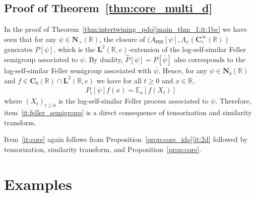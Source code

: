 \documentclass[12pt]{amsart}
\newcommand{\hlabel}{\phantomsection\label}
\numberwithin{equation}{section}
\newcommand{\bb}{\mathbb}
\renewcommand{\ge}{\geqslant}
\newcommand{\ov}{\overline}
\newcommand{\ttt}{\mathtt}
\newcommand{\bmrm}[2][2]{\mathbf{#2}^{#1}}
\newcommand{\C}{\mathbf{C}}
\newcommand{\LRe}{\bmrm{L}(\bb{R},e)}
\newcommand{\NN}{\mathbf{N}}
\theoremstyle{definition}
\theoremstyle{assump}
\theoremstyle{remark}
\begin{document}
{\subsection{Proof of Theorem~\ref{thm:core_multi_d}} \label{sec:thm29} In the proof of Theorem~\ref{thm:intertwining_pdo}\eqref{main_thm_1:it:1bc} we have seen that for any $\psi\in\NN_+(\bb R)$, the closure of $(A_\ttt{PDO}[\psi],\Lambda_\psi(\C^\infty_c(\bb R))$ generates $P[\psi]$, which is the $\LRe$-extension of the log-self-similar Feller semigroup associated to $\psi$. By duality, $\widehat{P}[\psi]=P[\ov{\psi}]$ also corresponds to the log-self-similar Feller semigroup associated with $\ov{\psi}$. Hence, for any $\psi\in\NN_b(\bb R)$ and $f\in\C_0(\bb R)\cap\LRe$ we have for all $t\ge 0$ and $x\in\bb R$,
\begin{align*}
	P_t[\psi] f(x)=\bb{E}_x[f(X_t)]
\end{align*}
where $(X_t)_{t\ge 0}$ is the log-self-similar Feller process associated to $\psi$. Therefore, item~\eqref{it:feller_semigroup} is a direct consequence of tensorization and similarity transform.

Item~\eqref{it:core} again follows from Proposition~\ref{prop:core_ido}\eqref{it:2d} followed by tensorization, similarity transform, and Proposition~\ref{prop:core}.

\section{Examples}\hlabel{examples}
}
\end{document}
